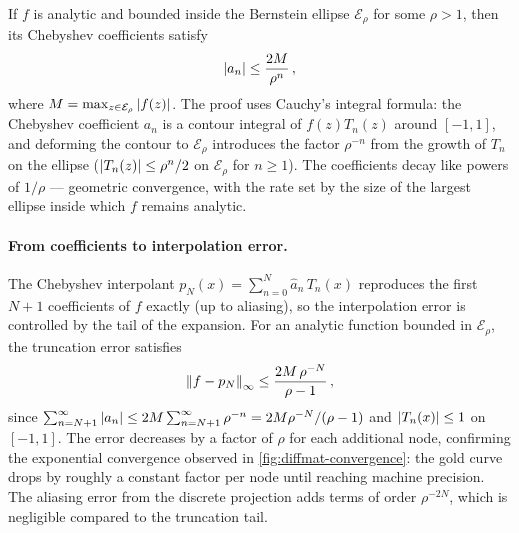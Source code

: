 If $f$ is analytic and bounded inside the Bernstein ellipse
$\mathcal{E}_\rho$ for some $\rho > 1$, then its Chebyshev
coefficients satisfy
%
\begin{equation}
  \left\lvert a_n \right\rvert \leq \frac{2M}{\rho^n} \,,
  \label{eq:coeff-decay-analytic}
\end{equation}
%
where $M = \max_{z \in \mathcal{E}_\rho}\left\lvert f(z) \right\rvert$.
The proof uses Cauchy's integral formula: the Chebyshev coefficient
$a_n$ is a contour integral of $f(z)T_n(z)$ around $[-1,1]$, and
deforming the contour to $\mathcal{E}_\rho$ introduces the factor
$\rho^{-n}$ from the growth of $T_n$ on the ellipse
($\left\lvert T_n(z) \right\rvert \leq \rho^n/2$ on $\mathcal{E}_\rho$ for $n \geq 1$).  The
coefficients decay like powers of $1/\rho$ --- geometric convergence,
with the rate set by the size of the largest ellipse inside which $f$
remains analytic.

\paragraph{From coefficients to interpolation error.}

The Chebyshev interpolant $p_N(x) = \sum_{n=0}^{N}
\hat{a}_n\,T_n(x)$ reproduces the first $N+1$ coefficients of $f$
exactly (up to aliasing), so the interpolation error is controlled by
the tail of the expansion.  For an analytic function bounded in
$\mathcal{E}_\rho$, the truncation error satisfies
%
\begin{equation}
  \left\lVert f - p_N \right\rVert_\infty
    \leq \frac{2M\,\rho^{-N}}{\rho - 1} \,,
  \label{eq:spec-interp-error}
\end{equation}
%
since $\sum_{n=N+1}^{\infty} \left\lvert a_n \right\rvert \leq
2M\sum_{n=N+1}^{\infty}\rho^{-n} = 2M\rho^{-N}/(\rho - 1)$ and
$\left\lvert T_n(x) \right\rvert \leq 1$ on $[-1,1]$.  The error decreases by a
factor of $\rho$ for each additional node, confirming the exponential
convergence observed in \cref{fig:diffmat-convergence}: the gold curve
drops by roughly a constant factor per node until reaching machine
precision.  The aliasing error from the discrete projection adds terms
of order $\rho^{-2N}$, which is negligible compared to the truncation
tail.

